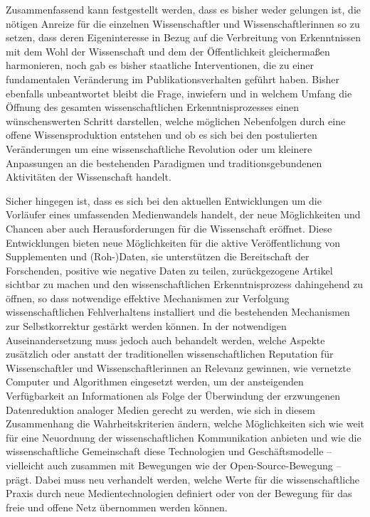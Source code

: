 Zusammenfassend kann festgestellt werden, dass es bisher weder gelungen ist, die nötigen Anreize für die einzelnen Wissenschaftler und Wissenschaftlerinnen so zu setzen, dass deren Eigeninteresse in Bezug auf die Verbreitung von Erkenntnissen mit dem Wohl der Wissenschaft und dem der Öffentlichkeit gleichermaßen harmonieren, noch gab es bisher staatliche Interventionen, die zu einer fundamentalen Veränderung im Publikationsverhalten geführt haben. Bisher ebenfalls unbeantwortet bleibt die Frage, inwiefern und in welchem Umfang die Öffnung des gesamten wissenschaftlichen Erkenntnisprozesses einen wünschenswerten Schritt darstellen, welche möglichen Nebenfolgen durch eine offene Wissensproduktion entstehen und ob es sich bei den postulierten Veränderungen um eine wissenschaftliche Revolution oder um kleinere Anpassungen an die bestehenden Paradigmen und traditionsgebundenen Aktivitäten der Wissenschaft handelt.

Sicher hingegen ist, dass es sich bei den aktuellen Entwicklungen um die Vorläufer eines umfassenden Medienwandels handelt, der neue Möglichkeiten und Chancen aber auch Herausforderungen für die Wissenschaft eröffnet. Diese Entwicklungen bieten neue Möglichkeiten für die aktive Veröffentlichung von Supplementen und (Roh-)Daten, sie unterstützen die Bereitschaft der Forschenden, positive wie negative Daten zu teilen, zurückgezogene Artikel sichtbar zu machen und den wissenschaftlichen Erkenntnisprozess dahingehend zu öffnen, so dass notwendige effektive Mechanismen zur Verfolgung wissenschaftlichen Fehlverhaltens installiert und die bestehenden Mechanismen zur Selbstkorrektur gestärkt werden können. In der notwendigen Auseinandersetzung muss jedoch auch behandelt werden, welche Aspekte zusätzlich oder anstatt der traditionellen wissenschaftlichen Reputation für Wissenschaftler und Wissenschaftlerinnen an Relevanz gewinnen, wie vernetzte Computer und Algorithmen eingesetzt werden, um der ansteigenden Verfügbarkeit an Informationen als Folge der Überwindung der erzwungenen Datenreduktion analoger Medien gerecht zu werden, wie sich in diesem Zusammenhang die Wahrheitskriterien ändern, welche Möglichkeiten sich wie weit für eine Neuordnung der wissenschaftlichen Kommunikation anbieten und wie die wissenschaftliche Gemeinschaft diese Technologien und Geschäftsmodelle – vielleicht auch zusammen mit Bewegungen wie der Open-Source-Bewegung – prägt. Dabei muss neu verhandelt werden, welche Werte für die wissenschaftliche Praxis durch neue Medientechnologien definiert oder von der Bewegung für das freie und offene Netz übernommen werden können.

